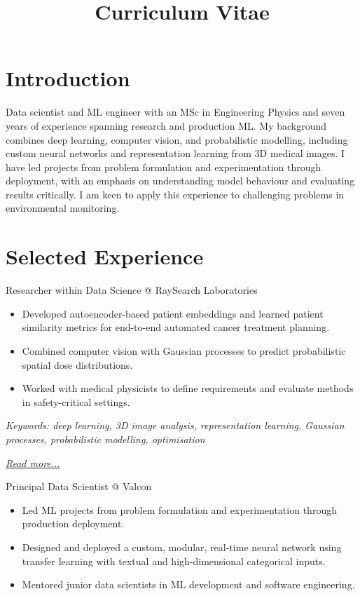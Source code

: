 \documentclass[11pt,a4paper]{moderncv}
\title{Curriculum Vitae}
\begin{document}
\makecvtitle

\section*{Introduction}
Data scientist and ML engineer with an MSc in Engineering Physics and seven years of experience spanning research and production ML. My background combines deep learning, computer vision, and probabilistic modelling, including custom neural networks and representation learning from 3D medical images. I have led projects from problem formulation and experimentation through deployment, with an emphasis on understanding model behaviour and evaluating results critically. I am keen to apply this experience to challenging problems in environmental monitoring.


\section{Selected Experience}

\large{Researcher within Data Science @ RaySearch Laboratories}

\normalsize

\begin{itemize}
    \item Developed autoencoder-based patient embeddings and learned patient similarity metrics for end-to-end automated cancer treatment planning.
    \item Combined computer vision with Gaussian processes to predict probabilistic spatial dose distributions.
    \item Worked with medical physicists to define requirements and evaluate methods in safety-critical settings.

\end{itemize}

{\footnotesize\textit{Keywords: deep learning, 3D image analysis, representation learning, Gaussian processes, probabilistic modelling, optimisation}}

\hfill{\small{\textit{\hyperref[sec:raysearch]{Read more...}}}}

\large{Principal Data Scientist @ Valcon}
\normalsize
\begin{itemize}
    \item Led ML projects from problem formulation and experimentation through production deployment.
    \item Designed and deployed a custom, modular, real-time neural network using transfer learning with textual and high-dimensional categorical inputs.
    \item Mentored junior data scientists in ML development and software engineering.
\end{itemize}
\end{document}
